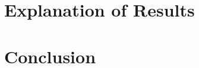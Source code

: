 \documentclass[letterpaper, 12pt]{article}
\begin{document}
\begin{sidewaysfigure}

\vspace{-4ex}
\caption{\label{fig:k2}{\em
  Sort Runtimes over Arrays of Length $n\cdot 10^6$, $k = 2$
}}
\end{sidewaysfigure}

\begin{sidewaysfigure}

\vspace{-4ex}
\caption{\label{fig:k15}{\em
  Sort Runtimes over Arrays of Length $n\cdot 10^6$, $k = 15$
}}
\end{sidewaysfigure}

\begin{sidewaysfigure}

\vspace{-4ex}
\caption{\label{fig:n750k}{\em
  Sort Runtimes over Arrays of Radius $k$, $n = 0.75\cdot 10^6$
}}
\end{sidewaysfigure}

\begin{sidewaysfigure}

\vspace{-4ex}
\caption{\label{fig:n1250k}{\em
  Sort Runtimes over Arrays of Radius $k$, $n = 1.25\cdot 10^6$
}}
\end{sidewaysfigure}

\clearpage
\section{Explanation of Results}

\section{Conclusion}

\clearpage

\nocite{*}
\end{document}
